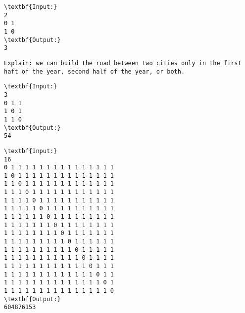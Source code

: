 \begin{verbatim}
\textbf{Input:}
2
0 1
1 0
\textbf{Output:}
3\end{verbatim}
\begin{verbatim}
Explain: we can build the road between two cities only in the first haft of the year, second half of the year, or both.\end{verbatim}
\begin{verbatim}
\textbf{Input:}
3
0 1 1
1 0 1
1 1 0
\textbf{Output:}
54
\end{verbatim}
\begin{verbatim}
\textbf{Input:}
16
0 1 1 1 1 1 1 1 1 1 1 1 1 1 1 1
1 0 1 1 1 1 1 1 1 1 1 1 1 1 1 1
1 1 0 1 1 1 1 1 1 1 1 1 1 1 1 1
1 1 1 0 1 1 1 1 1 1 1 1 1 1 1 1
1 1 1 1 0 1 1 1 1 1 1 1 1 1 1 1
1 1 1 1 1 0 1 1 1 1 1 1 1 1 1 1
1 1 1 1 1 1 0 1 1 1 1 1 1 1 1 1
1 1 1 1 1 1 1 0 1 1 1 1 1 1 1 1
1 1 1 1 1 1 1 1 0 1 1 1 1 1 1 1
1 1 1 1 1 1 1 1 1 0 1 1 1 1 1 1
1 1 1 1 1 1 1 1 1 1 0 1 1 1 1 1
1 1 1 1 1 1 1 1 1 1 1 0 1 1 1 1
1 1 1 1 1 1 1 1 1 1 1 1 0 1 1 1
1 1 1 1 1 1 1 1 1 1 1 1 1 0 1 1
1 1 1 1 1 1 1 1 1 1 1 1 1 1 0 1
1 1 1 1 1 1 1 1 1 1 1 1 1 1 1 0
\textbf{Output:}
604876153\end{verbatim}
